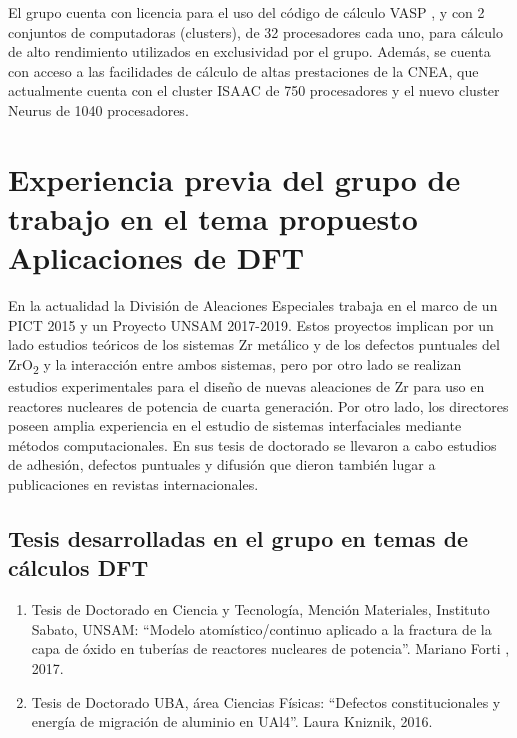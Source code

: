 El grupo cuenta con licencia para el uso del código de cálculo VASP\cite{Hafner2007,
Hafner2008} , y con 
2 conjuntos de computadoras (clusters), de 32 procesadores cada uno, para 
cálculo de alto rendimiento utilizados en exclusividad por el grupo. Además, se 
cuenta con acceso a las facilidades de cálculo de altas prestaciones de la CNEA, 
que actualmente cuenta con el cluster ISAAC de 750 procesadores y el 
nuevo cluster Neurus de 1040 procesadores.

\section{Experiencia previa del grupo de trabajo en el tema 
propuesto Aplicaciones de DFT}

En la actualidad la División de Aleaciones Especiales trabaja en el marco 
de un 
PICT 2015 y un Proyecto UNSAM 2017-2019. Estos proyectos implican por un 
lado 
estudios teóricos de los sistemas Zr metálico y de los defectos puntuales 
del 
ZrO\textsubscript{2} y la interacción entre ambos sistemas, pero por otro lado se realizan 
estudios experimentales para el diseño de nuevas aleaciones de Zr para 
uso en 
reactores nucleares de potencia de cuarta generación. 
Por otro lado, los directores poseen amplia experiencia en el estudio de 
sistemas interfaciales mediante métodos computacionales. En sus tesis de 
doctorado se llevaron a cabo estudios de adhesión, defectos puntuales y 
difusión que dieron también lugar a publicaciones en revistas internacionales. 

\subsection{ Tesis desarrolladas en el grupo en temas de cálculos DFT}

\begin{enumerate}


\item Tesis de Doctorado en Ciencia y Tecnología, Mención Materiales, 
Instituto Sabato, UNSAM: “Modelo atomístico/continuo aplicado a la fractura de 
la capa de óxido en tuberías de reactores nucleares de potencia”. Mariano Forti 
, 2017.

\item Tesis de Doctorado UBA, área Ciencias Físicas: “Defectos 
constitucionales y energía de migración de aluminio en UAl4”. Laura Kniznik, 
2016. 

\end{enumerate}

